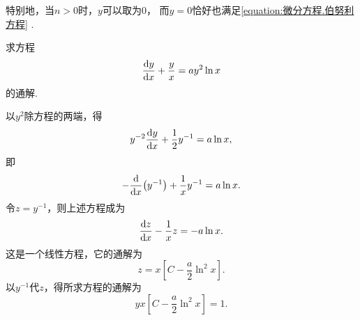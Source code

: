 特别地，当\(n>0\)时，\(y\)可以取为\(0\)，
而\(y=0\)恰好也满足\cref{equation:微分方程.伯努利方程} .

\begin{example}
求方程\begin{equation*}
	\dv{y}{x} + \frac{y}{x} = a y^2 \ln x
\end{equation*}的通解.
\begin{solution}
以\(y^2\)除方程的两端，得\begin{equation*}
	y^{-2} \dv{y}{x} + \frac{1}{2} y^{-1} = a \ln x,
\end{equation*}
即\begin{equation*}
	- \dv{x}(y^{-1}) + \frac{1}{x} y^{-1} = a \ln x.
\end{equation*}
令\(z = y^{-1}\)，则上述方程成为\begin{equation*}
	\dv{z}{x} - \frac{1}{x} z = -a \ln x.
\end{equation*}
这是一个线性方程，它的通解为\begin{equation*}
	z = x \left[ C - \frac{a}{2} \ln^2 x \right].
\end{equation*}
以\(y^{-1}\)代\(z\)，得所求方程的通解为\begin{equation*}
	yx \left[ C - \frac{a}{2} \ln^2 x \right] = 1.
\end{equation*}
\end{solution}
\end{example}

